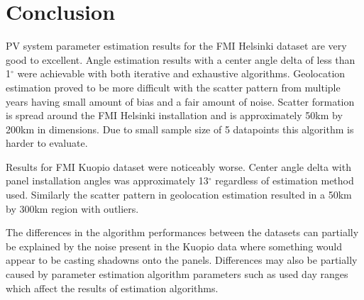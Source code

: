 \chapter{Conclusion}
PV system parameter estimation results for the FMI Helsinki dataset are very good to excellent. Angle estimation results with a center angle delta of less than 1$^\circ$ were achievable with both iterative and exhaustive algorithms. Geolocation estimation proved to be more difficult with the scatter pattern from multiple years having small amount of bias and a fair amount of noise. Scatter formation is spread around the FMI Helsinki installation and is approximately 50km by 200km in dimensions. Due to small sample size of 5 datapoints this algorithm is harder to evaluate.

Results for FMI Kuopio dataset were noticeably worse. Center angle delta with panel installation angles was approximately 13$^\circ$ regardless of estimation method used. Similarly the scatter pattern in geolocation estimation resulted in a 50km by 300km region with outliers.

The differences in the algorithm performances between the datasets can partially be explained by the noise present in the Kuopio data where something would appear to be casting shadowns onto the panels. Differences may also be partially caused by parameter estimation algorithm parameters such as used day ranges which affect the results of estimation algorithms.















